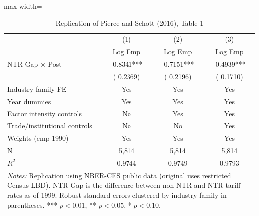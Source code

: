 \begin{table}[htbp]
\centering
\caption{Replication of Pierce and Schott (2016), Table 1}
\label{tab:pierce_schott_t1}
\begin{adjustbox}{max width=\textwidth}
\begin{tabular}{lccc}
\toprule
 & (1) & (2) & (3) \\
 & Log Emp & Log Emp & Log Emp \\
\midrule
NTR Gap $\times$ Post &   -0.8341*** &   -0.7151*** &   -0.4939*** \\
 & (   0.2369) & (   0.2196) & (   0.1710) \\
\addlinespace
Industry family FE & Yes & Yes & Yes \\
Year dummies & Yes & Yes & Yes \\
Factor intensity controls & No & Yes & Yes \\
Trade/institutional controls & No & No & Yes \\
Weights (emp 1990) & Yes & Yes & Yes \\
\midrule
N &     5,814 &     5,814 &     5,814 \\
$R^2$ & 0.9744 & 0.9749 & 0.9793 \\
\bottomrule
\multicolumn{4}{p{0.90\linewidth}}{\footnotesize
\textit{Notes:} Replication using NBER-CES public data (original uses restricted Census LBD). 
NTR Gap is the difference between non-NTR and NTR tariff rates as of 1999. 
Robust standard errors clustered by industry family in parentheses. 
*** $p<0.01$, ** $p<0.05$, * $p<0.10$.}
\end{tabular}
\end{adjustbox}
\end{table}
